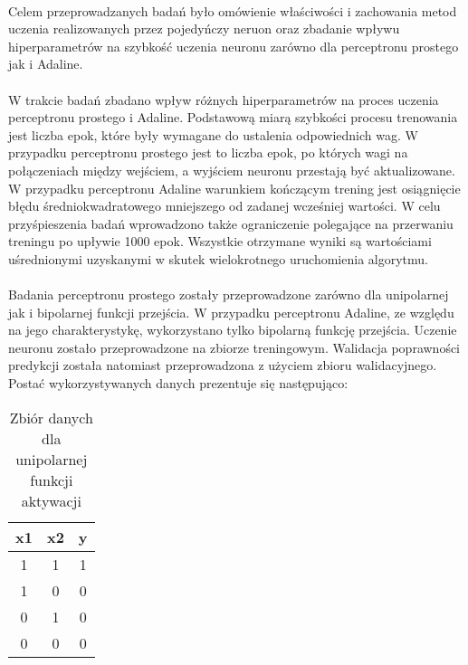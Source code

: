 \documentclass[../main.tex]{subfiles}
\begin{document}
    \paragraph{}
    Celem przeprowadzanych badań było omówienie właściwości i zachowania metod uczenia realizowanych przez pojedyńczy neruon oraz zbadanie wpływu hiperparametrów na szybkość uczenia neuronu zarówno dla perceptronu prostego jak i Adaline.
    
    \paragraph{}
    W trakcie badań zbadano wpływ różnych hiperparametrów na proces uczenia perceptronu prostego i Adaline. Podstawową miarą szybkości procesu trenowania jest liczba epok, które były wymagane do ustalenia odpowiednich wag.
    W przypadku perceptronu prostego jest to liczba epok, po których wagi na połączeniach między wejściem, a wyjściem neuronu przestają być aktualizowane. W przypadku perceptronu Adaline warunkiem kończącym trening jest osiągnięcie błędu średniokwadratowego mniejszego od zadanej wcześniej wartości. W celu przyśpieszenia badań wprowadzono także ograniczenie polegające na przerwaniu treningu po upływie 1000 epok. Wszystkie otrzymane wyniki są wartościami uśrednionymi uzyskanymi w skutek wielokrotnego uruchomienia algorytmu.
    
    \paragraph{}
    Badania perceptronu prostego zostały przeprowadzone zarówno dla unipolarnej jak i bipolarnej funkcji przejścia. W przypadku perceptronu Adaline, ze względu na jego charakterystykę, wykorzystano tylko bipolarną funkcję przejścia. Uczenie neuronu zostało przeprowadzone na zbiorze treningowym. Walidacja poprawności predykcji została natomiast przeprowadzona z użyciem zbioru walidacyjnego. Postać wykorzystywanych danych prezentuje się następująco:
    
    \begin{table}[h]
    \centering
    \begin{tabular}{|| c | c | c ||}
    \hline
    x1 & x2 & y \\ \hline
    1  & 1  & 1 \\
    1  & 0  & 0 \\
    0  & 1  & 0 \\
    0  & 0  & 0 \\ \hline
    \end{tabular}
    \caption{Zbiór danych dla unipolarnej funkcji aktywacji}
    \label{dataset_unipolar:1}
    \end{table}
    
\end{document}
